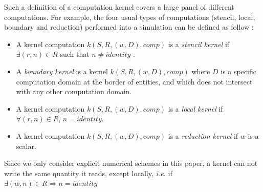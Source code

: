 Such a definition of a computation kernel covers a large panel of different computations. For example, the four usual types of computations (stencil, local, boundary and reduction) performed into a simulation can be defined as follow :
\begin{itemize}
\item A kernel computation $k(S,R,(w,D),comp)$ is a \emph{stencil kernel} if $\exists (r,n) \in R$ such that $n \neq identity$ .
\item A \emph{boundary kernel} is a kernel $k(S,R,(w,D),comp)$ where $D$ is a specific computation domain at the border of entities, and which does not intersect with any other computation domain.
\item A kernel computation $k(S,R,(w,D),comp)$ is a \emph{local kernel} if $\forall (r,n) \in R$, $n = identity$.
\item A kernel computation $k(S,R,(w,D),comp)$ is a \emph{reduction kernel} if $w$ is a scalar.%
\end{itemize}
Since we only consider explicit numerical schemes in this paper, a kernel can not write the same quantity it reads, except locally, \textit{i.e.} if $\exists (w,n) \in R\Rightarrow n=identity$





